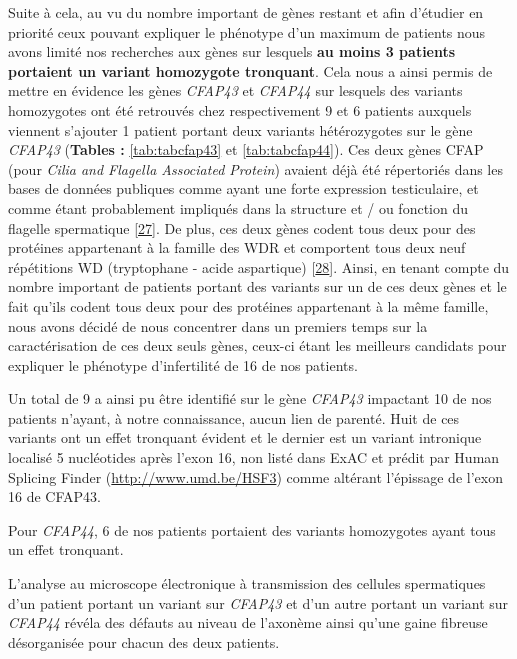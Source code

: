 \documentclass[12pt,a4paper,twoside]{ugathesis}
\begin{document}
Suite à cela, au vu du nombre important de gènes restant et afin
d'étudier en priorité ceux pouvant expliquer le phénotype d'un maximum
de patients nous avons limité nos recherches aux gènes sur lesquels
\textbf{au moins 3 patients portaient un variant homozygote tronquant}.
Cela nous a ainsi permis de mettre en évidence les gènes \emph{CFAP43}
et \emph{CFAP44} sur lesquels des variants homozygotes ont été retrouvés
chez respectivement 9 et 6 patients auxquels viennent s'ajouter 1
patient portant deux variants hétérozygotes sur le gène \emph{CFAP43}
(\textbf{Tables : }\ref{tab:tabcfap43} et \ref{tab:tabcfap44}). Ces deux
gènes CFAP (pour \emph{Cilia and Flagella Associated Protein}) avaient
déjà été répertoriés dans les bases de données publiques comme ayant une
forte expression testiculaire, et comme étant probablement impliqués
dans la structure et / ou fonction du flagelle spermatique
{[}\protect\hyperlink{ref-Ivliev2012}{27}{]}. De plus, ces deux gènes
codent tous deux pour des protéines appartenant à la famille des WDR et
comportent tous deux neuf répétitions WD (tryptophane - acide
aspartique) {[}\protect\hyperlink{ref-Smith2008}{28}{]}. Ainsi, en
tenant compte du nombre important de patients portant des variants sur
un de ces deux gènes et le fait qu'ils codent tous deux pour des
protéines appartenant à la même famille, nous avons décidé de nous
concentrer dans un premiers temps sur la caractérisation de ces deux
seuls gènes, ceux-ci étant les meilleurs candidats pour expliquer le
phénotype d'infertilité de 16 de nos patients.

Un total de 9 a ainsi pu être identifié sur le gène \emph{CFAP43}
impactant 10 de nos patients n'ayant, à notre connaissance, aucun lien
de parenté. Huit de ces variants ont un effet tronquant évident et le
dernier est un variant intronique localisé 5 nucléotides après l'exon
16, non listé dans ExAC et prédit par Human Splicing Finder
(\url{http://www.umd.be/HSF3}) comme altérant l'épissage de l'exon 16 de
CFAP43.

Pour \emph{CFAP44}, 6 de nos patients portaient des variants homozygotes
ayant tous un effet tronquant.

L'analyse au microscope électronique à transmission des cellules
spermatiques d'un patient portant un variant sur \emph{CFAP43} et d'un
autre portant un variant sur \emph{CFAP44} révéla des défauts au niveau
de l'axonème ainsi qu'une gaine fibreuse désorganisée pour chacun des
deux patients.
\end{document}
